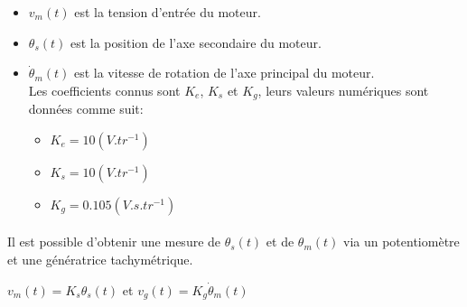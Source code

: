 	\begin{itemize} [label=,font=\small \color{black}]
	\item $v_{m}(t)$\hspace{1mm} est la tension d'entrée du moteur.
	\item $\theta_{s}(t)$\hspace{1mm} est la position de l'axe secondaire du moteur.
	\item $\dot{\theta}_{m}(t)$ est la vitesse de rotation de l'axe principal du moteur.\\
	Les coefficients connus sont $K_{e}$, $K_{s}$ et $K_{g}$, leurs valeurs numériques sont données comme suit:
	\begin{itemize} [label=,font=\small \color{black}]
	\item $K_{e} = 10(V.tr^{-1})$
	\item $K_{s} = 10(V.tr^{-1})$
	\item $K_{g} = 0.105(V.s.tr^{-1})$
	\end{itemize}
	\end{itemize}
	
	\paragraph{}
		Il est possible d’obtenir une mesure de $\theta_{s}(t)$ et de $\theta_{m}(t)$ via un potentiomètre et une génératrice tachymétrique.
		
		\begin{center}
		$v_{m}(t) = K_{s}\theta_{s}(t)$ \hspace{1.5cm} et \hspace{1.5cm} $v_{g}(t) = K_{g}\dot{\theta}_{m}(t)$ 
		\end{center}
		

